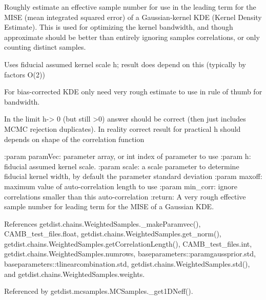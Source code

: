 \begin{DoxyVerb}Roughly estimate an effective sample number for use in the leading term for the MISE (mean integrated squared error)
of a Gaussian-kernel KDE (Kernel Density Estimate). This is used for optimizing the kernel bandwidth, and though 
approximate should be better than entirely ignoring samples correlations, or only counting distinct samples.

Uses fiducial assumed kernel scale h; result does depend on this (typically by factors O(2))

For bias-corrected KDE only need very rough estimate to use in rule of thumb for bandwidth.

In the limit h-> 0 (but still >0) answer should be correct (then just includes MCMC rejection duplicates).        
In reality correct result for practical h should depends on shape of the correlation function

:param paramVec: parameter array, or int index of parameter to use 
:param h: fiducial assumed kernel scale.
:param scale: a scale parameter to determine fiducial kernel width, by default the parameter standard deviation
:param maxoff: maximum value of auto-correlation length to use
:param min_corr: ignore correlations smaller than this auto-correlation
:return: A very rough effective sample number for leading term for the MISE of a Gaussian KDE.
\end{DoxyVerb}
 

References getdist.\+chains.\+Weighted\+Samples.\+\_\+make\+Paramvec(), C\+A\+M\+B\+\_\+test\+\_\+files.\+float, getdist.\+chains.\+Weighted\+Samples.\+get\+\_\+norm(), getdist.\+chains.\+Weighted\+Samples.\+get\+Correlation\+Length(), C\+A\+M\+B\+\_\+test\+\_\+files.\+int, getdist.\+chains.\+Weighted\+Samples.\+numrows, baseparameters\+::paramgaussprior.\+std, baseparameters\+::tlinearcombination.\+std, getdist.\+chains.\+Weighted\+Samples.\+std(), and getdist.\+chains.\+Weighted\+Samples.\+weights.



Referenced by getdist.\+mcsamples.\+M\+C\+Samples.\+\_\+get1\+D\+Neff().


